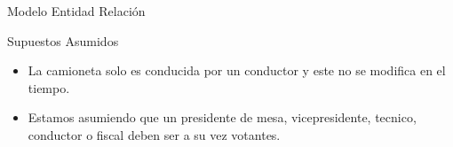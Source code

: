 \begin{section}{Modelo Entidad Relaci\'on}
\begin{subsection}{Supuestos Asumidos}
\begin{itemize}

\item La camioneta solo es conducida por un conductor y este no se modifica en el tiempo.

\item Estamos asumiendo que un presidente de mesa, vicepresidente, tecnico, conductor o fiscal deben ser a su vez votantes.

\end{itemize}

\end{subsection}

\end{section}

